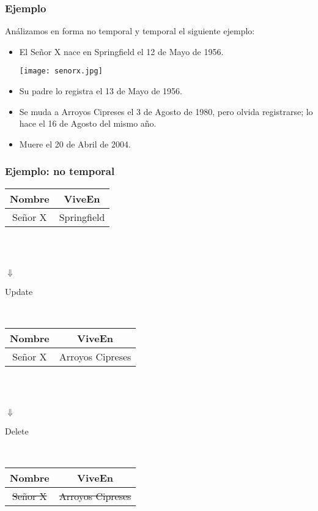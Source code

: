 \documentclass[a4paper,12pt,oneside]{report}
\begin{document}
\subsubsection*{Ejemplo}
An\'alizamos en forma no temporal y temporal el siguiente ejemplo:
\begin{itemize}
\item El Se\~nor X nace en Springfield el 12 de Mayo de 1956.
\begin{center}\texttt{[image: senorx.jpg]}\end{center}
\item Su padre lo registra el 13 de Mayo de 1956.
\item Se muda a Arroyos Cipreses el 3 de Agosto de 1980, pero olvida registrarse; lo hace el 16 de Agosto del mismo a\~no.
\item Muere el 20 de Abril de 2004.
\end{itemize}
\subsubsection*{Ejemplo: no temporal}
\begin{center}
\begin{tabular}{|c|c|}
\hline
Nombre & ViveEn\\
\hline
Se\~nor X & Springfield\\
\hline
\end{tabular}
\\
\ \\
\begin{Huge}{$\Downarrow$}\end{Huge}\begin{small}{Update}\end{small}\\
\begin{tabular}{|c|c|}
\hline
Nombre & ViveEn\\
\hline
Se\~nor X & Arroyos Cipreses\\
\hline
\end{tabular}
\\
\ \\
\begin{Huge}{$\Downarrow$}\end{Huge}\begin{small}{Delete}\end{small}\\
\begin{tabular}{|c|c|}
\hline
Nombre & ViveEn\\
\hline
\sout{Se\~nor X} & \sout{Arroyos Cipreses}\\
\hline
\end{tabular}
\end{center}
\end{document}
